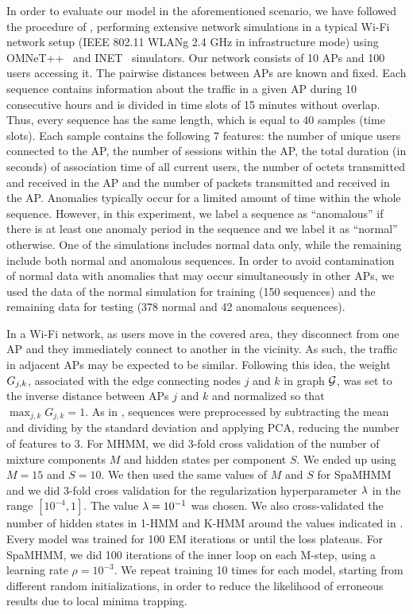 In order to evaluate our model in the aforementioned scenario, we have followed the procedure of \citet{Anisa2017}, performing extensive network simulations in a typical Wi-Fi network setup (IEEE 802.11 WLANg 2.4 GHz in infrastructure mode) using OMNeT++~\citet{omnetpp} and INET~\citet{inet} simulators. Our network consists of 10 APs and 100 users accessing it. The pairwise distances between APs are known and fixed. Each sequence contains information about the traffic in a given AP during 10 consecutive hours and is divided in time slots of 15 minutes without overlap. Thus, every sequence has the same length, which is equal to 40 samples (time slots). Each sample contains the following 7 features: the number of unique users connected to the AP, the number of sessions within the AP, the total duration (in seconds) of association time of all current users, the number of octets transmitted and received in the AP and the number of packets transmitted and received in the AP. Anomalies typically occur for a limited amount of time within the whole sequence. However, in this experiment, we label a sequence as ``anomalous'' if there is at least one anomaly period in the sequence and we label it as ``normal'' otherwise. One of the simulations includes normal data only, while the remaining include both normal and anomalous sequences. In order to avoid contamination of normal data with anomalies that may occur simultaneously in other APs, we used the data of the normal simulation for training (150 sequences) and the remaining data for testing (378 normal and 42 anomalous sequences). 

In a Wi-Fi network, as users move in the covered area, they disconnect from one AP and they immediately connect to another in the vicinity. As such, the traffic in adjacent APs may be expected to be similar. Following this idea, the weight ${G}_{j,k}$, associated with the edge connecting nodes $j$ and $k$ in graph ${\mathcal{G}}$, was set to the inverse distance between APs $j$ and $k$ and normalized so that $\max_{j,k} G_{j,k}=1$. As in \citet{Anisa2017}, sequences were preprocessed by subtracting the mean and dividing by the standard deviation and applying PCA, reducing the number of features to 3. For MHMM, we did 3-fold cross validation of the number of mixture components $M$ and hidden states per component $S$. We ended up using $M=15$ and $S=10$. We then used the same values of $M$ and $S$ for SpaMHMM and we did 3-fold cross validation for the regularization hyperparameter $\lambda$ in the range $[10^{-4}, 1]$. The value $\lambda=10^{-1}$ was chosen. We also cross-validated the number of hidden states in 1-HMM and K-HMM around the values indicated in . Every model was trained for 100 EM iterations or until the loss plateaus. For SpaMHMM, we did 100 iterations of the inner loop on each M-step, using a learning rate $\rho=10^{-3}$. We repeat training 10 times for each model, starting from different random initializations, in order to reduce the likelihood of erroneous results due to local minima trapping.

